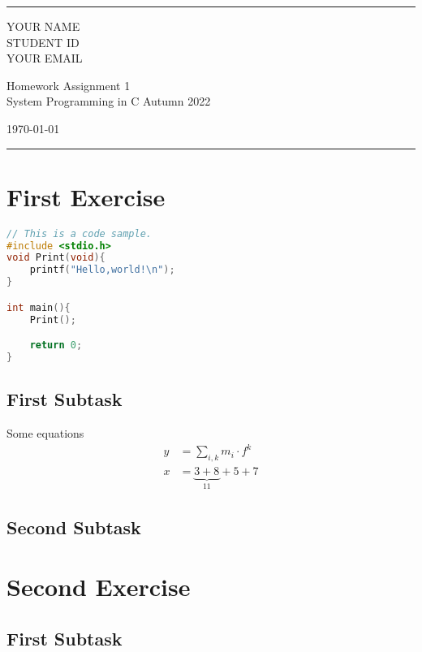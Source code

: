 \documentclass[a4paper]{article}
\begin{document}

\fancyhead[C]{}
\hrule \medskip %
\begin{minipage}{0.295\textwidth} 
\raggedright
\footnotesize
YOUR NAME \hfill\\   
STUDENT ID \hfill\\
YOUR EMAIL
\end{minipage}
\begin{minipage}{0.4\textwidth} 
\centering 
\large 
Homework Assignment 1\\ 
\normalsize 
System Programming in C Autumn 2022\\ 
\end{minipage}
\begin{minipage}{0.295\textwidth} 
\raggedleft
\today\hfill\\
\end{minipage}
\medskip\hrule 
\bigskip


\indent

\section{First Exercise}


\begin{lstlisting}[language=C++,label={list:first},caption=Sample C code -- Hello Wrold.]
// This is a code sample.
#include <stdio.h>
void Print(void){
    printf("Hello,world!\n");
}

int main(){
    Print();

    return 0;
}
\end{lstlisting}

\blindtext
\subsection{First Subtask}
Some equations
\begin{align*}
y &=  \sum\limits_{i,k} m_i \cdot f^k \\
x &=  
\underset{11}{\underbrace{3 + 8}} + 5 + 7
\end{align*}

\subsection{Second Subtask}
\blindtext

\bigskip


\section{Second Exercise}
\blindtext
\subsection{First Subtask}

\bigskip

\end{document}
